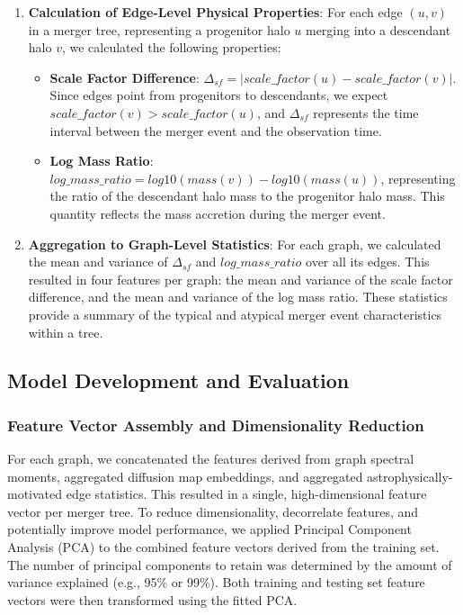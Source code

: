 \documentclass[twocolumn]{aastex631}
\begin{document}
\begin{enumerate}
    \item \textbf{Calculation of Edge-Level Physical Properties}: For each edge $(u, v)$ in a merger tree, representing a progenitor halo $u$ merging into a descendant halo $v$, we calculated the following properties:
    \begin{itemize}
        \item \textbf{Scale Factor Difference}: $\Delta_{sf} = |scale\_factor(u) - scale\_factor(v)|$. Since edges point from progenitors to descendants, we expect $scale\_factor(v) > scale\_factor(u)$, and $\Delta_{sf}$ represents the time interval between the merger event and the observation time.
        \item \textbf{Log Mass Ratio}: $log\_mass\_ratio = log10(mass(v)) - log10(mass(u))$, representing the ratio of the descendant halo mass to the progenitor halo mass. This quantity reflects the mass accretion during the merger event.
    \end{itemize}

    \item \textbf{Aggregation to Graph-Level Statistics}: For each graph, we calculated the mean and variance of $\Delta_{sf}$ and $log\_mass\_ratio$ over all its edges. This resulted in four features per graph: the mean and variance of the scale factor difference, and the mean and variance of the log mass ratio. These statistics provide a summary of the typical and atypical merger event characteristics within a tree.
\end{enumerate}

\subsection{Model Development and Evaluation}

\subsubsection{Feature Vector Assembly and Dimensionality Reduction}
For each graph, we concatenated the features derived from graph spectral moments, aggregated diffusion map embeddings, and aggregated astrophysically-motivated edge statistics. This resulted in a single, high-dimensional feature vector per merger tree. To reduce dimensionality, decorrelate features, and potentially improve model performance, we applied Principal Component Analysis (PCA) to the combined feature vectors derived from the training set. The number of principal components to retain was determined by the amount of variance explained (e.g., 95\% or 99\%). Both training and testing set feature vectors were then transformed using the fitted PCA.
\end{document}
